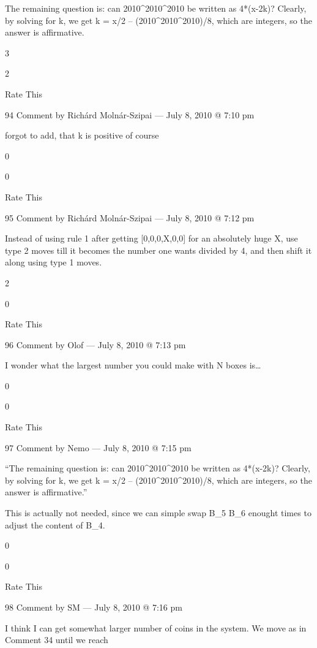 {    The remaining question is: can 2010^2010^2010 be written as
    4*(x-2k)?  Clearly, by solving for k, we get k = x/2 –
    (2010^2010^2010)/8, which are integers, so the answer is
    affirmative.
     
    3
     
    2
     
    Rate This

    94 Comment by Richárd Molnár-Szipai — July 8, 2010 @ 7:10 pm

        forgot to add, that k is positive of course
         
        0
         
        0
         
        Rate This

        95 Comment by Richárd Molnár-Szipai — July 8, 2010 @ 7:12 pm

        Instead of using rule 1 after getting [0,0,0,X,0,0] for an
        absolutely huge X, use type 2 moves till it becomes the number
        one wants divided by 4, and then shift it along using type 1
        moves.
         
        2
         
        0
         
        Rate This

        96 Comment by Olof — July 8, 2010 @ 7:13 pm

        I wonder what the largest number you could make with N boxes is…
         
        0
         
        0
         
        Rate This

        97 Comment by Nemo — July 8, 2010 @ 7:15 pm

        “The remaining question is: can 2010^2010^2010 be written as 4*(x-2k)?
        Clearly, by solving for k, we get k = x/2 – (2010^2010^2010)/8, which are integers, so the answer is affirmative.”

        This is actually not needed, since we can simple swap B_5 \leftrightarrow B_6 enought times to adjust the content of B_4.
         
        0
         
        0
         
        Rate This

        98 Comment by SM — July 8, 2010 @ 7:16 pm

    I think I can get somewhat larger number of coins in the system. We move as in Comment 34 until we reach

}

